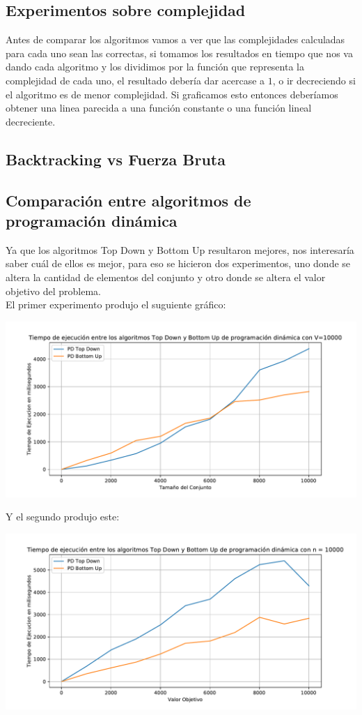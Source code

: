 \documentclass[a4paper]{article}
\begin{document}
\subsection{Experimentos sobre complejidad}
Antes de comparar los algoritmos vamos a ver que las complejidades calculadas para cada uno sean las correctas, si tomamos los resultados en tiempo que nos va dando cada algoritmo y los dividimos por la función que representa la complejidad de cada uno, el resultado debería dar acercase a $1$, o ir decreciendo si el algoritmo es de menor complejidad. Si graficamos esto entonces deberíamos obtener una linea parecida a una función constante o una función lineal decreciente.

\subsection{Backtracking vs Fuerza Bruta}

\subsection{Comparación entre algoritmos de programación dinámica}

Ya que los algoritmos Top Down y Bottom Up resultaron mejores, nos interesaría saber cuál de ellos es mejor, para eso se hicieron dos experimentos, uno donde se altera la cantidad de elementos del conjunto y otro donde se altera el valor objetivo del problema.
\\
El primer experimento produjo el suguiente gráfico:

\begin{center}
	\includegraphics[width=.8\linewidth]{G2.pdf}
\end{center}

Y el segundo produjo este:

\begin{center}
	\includegraphics[width=.8\linewidth]{G4.pdf}
\end{center}
\end{document}
